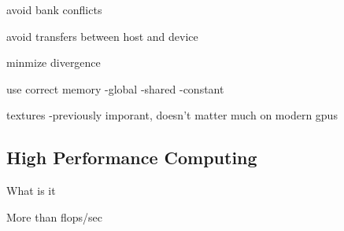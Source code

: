 \documentclass[10pt,a4paper]{article}
\begin{document}
avoid bank conflicts

avoid transfers between host and device

minmize divergence

use correct memory
-global
-shared
-constant

textures
-previously imporant, doesn't matter much on modern gpus

\cite{cuda, cuda_best_practice}




\clearpage
\subsection{High Performance Computing}
What is it

More than flops/sec

\end{document}
